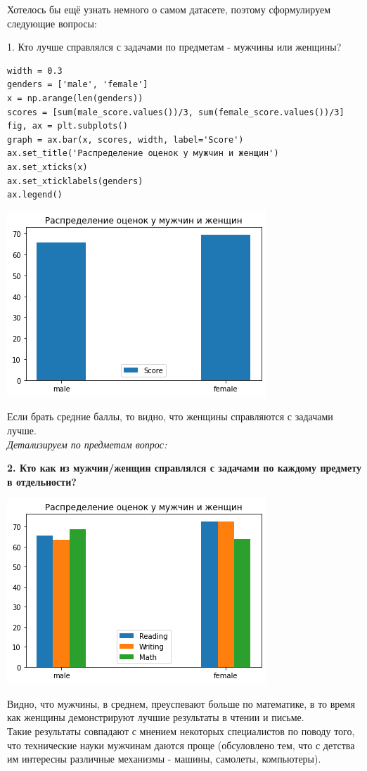 \documentclass[12pt,a4paper]{article}
\begin{document}
Хотелось бы ещё узнать немного о самом датасете, поэтому сформулируем следующие вопросы:

1. Кто лучше справлялся с задачами по предметам - мужчины или женщины?

\begin{verbatim}
width = 0.3
genders = ['male', 'female']
x = np.arange(len(genders))
scores = [sum(male_score.values())/3, sum(female_score.values())/3]
fig, ax = plt.subplots()
graph = ax.bar(x, scores, width, label='Score')
ax.set_title('Распределение оценок у мужчин и женщин')
ax.set_xticks(x)
ax.set_xticklabels(genders)
ax.legend()
\end{verbatim}

\includegraphics{mf_score_avg}

Если брать средние баллы, то видно, что женщины справляются с задачами лучше.\\
\textit{Детализируем по предметам вопрос:}

\textbf{2. Кто как из мужчин/женщин справлялся с задачами по каждому предмету в отдельности?}

\includegraphics{mf_score}

Видно, что мужчины, в среднем, преуспевают больше по математике, в то время как женщины демонстрируют лучшие результаты в чтении и письме. \\
Такие результаты совпадают с мнением некоторых специалистов по поводу того, что технические науки мужчинам даются проще (обсуловлено тем, что с детства им интересны различные механизмы - машины, самолеты, компьютеры).
\end{document}
